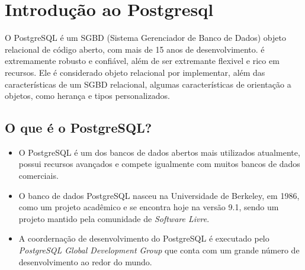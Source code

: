 \newpage \chapter{Introdução ao Postgresql}\setcounter{SteP}{1}

    O PostgreSQL é um SGBD (Sistema Gerenciador de Banco de
Dados) objeto relacional de código aberto, com mais de 15 anos
de desenvolvimento. é extremamente robusto e confiável, além de
ser extremante flexivel e rico em recursos. Ele é considerado 
objeto relacional por implementar, além das características de
um SGBD relacional, algumas características de orientação a
objetos, como herança e tipos personalizados.

\section{O que é o PostgreSQL?}\setcounter{SteP}{1}

\begin{itemize}
\item{\bf } O PostgreSQL é um dos bancos de dados abertos mais utilizados
atualmente, possui recursos avançados e compete igualmente com
muitos bancos de dados comerciais.

\item{\bf } O banco de dados PostgreSQL nasceu na Universidade de Berkeley,
em 1986, como um projeto acadêmico e se encontra hoje na versão 9.1, 
sendo um projeto mantido pela comunidade de {\it Software Livre}.

\item{\bf }A coordernação de desenvolvimento do PostgreSQL é executado pelo 
{\it PostgreSQL Global Development Group} que conta com um grande 
número de desenvolvimento ao redor do mundo.
\end{itemize}
